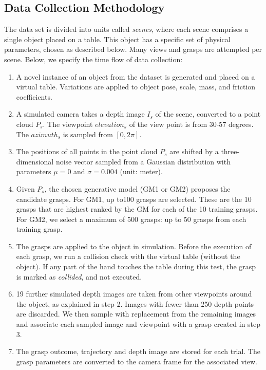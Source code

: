 \subsection{Data Collection Methodology}
\label{subsection:dataCollection}

The data set is divided into units called \textit{scenes}, where each scene comprises a single object placed on a table. This object has a specific set of physical parameters, chosen as described below. Many views and grasps are attempted per scene. Below, we specify the time flow of data collection:

\begin{enumerate}
\item A novel instance of an object from the dataset is generated and placed on a virtual table. Variations are applied to object pose, scale, mass, and friction coefficients.
\item A simulated camera takes a depth image $I_s$ of the scene, converted to a point cloud $P_s$. The viewpoint ${elevation}_s$ of the view point is from 30-57 degrees. The ${azimuth}_s$ is sampled from $[0, 2\pi]$. 
\item The positions of all points in the point cloud $P_s$ are shifted by a three-dimensional noise vector sampled from a Gaussian distribution with parameters $\mu=0$ and $\sigma = 0.004$ (unit: meter).
\item Given $P_s$, the chosen generative model (GM1 or GM2) proposes the candidate grasps. For GM1, up to100 grasps are selected. These are the 10 grasps that are highest ranked by the GM for each of the 10 training grasps. For GM2, we select a maximum of 500 grasps: up to 50 grasps from each training grasp.
\item The grasps are applied to the object in simulation. Before the execution of each grasp, we run a collision check with the virtual table (without the object). If any part of the hand touches the table during this test, the grasp is marked as \textit{collided}, and not executed.
\item 19 further simulated depth images are taken from other viewpoints around the object, as explained in step 2. Images with fewer than 250 depth points are discarded. We then sample with replacement from the remaining images and associate each sampled image and viewpoint with a grasp created in step 3.
\item The grasp outcome, trajectory and depth image are stored for each trial. The grasp parameters are converted to the camera frame for the associated view.
\end{enumerate}

